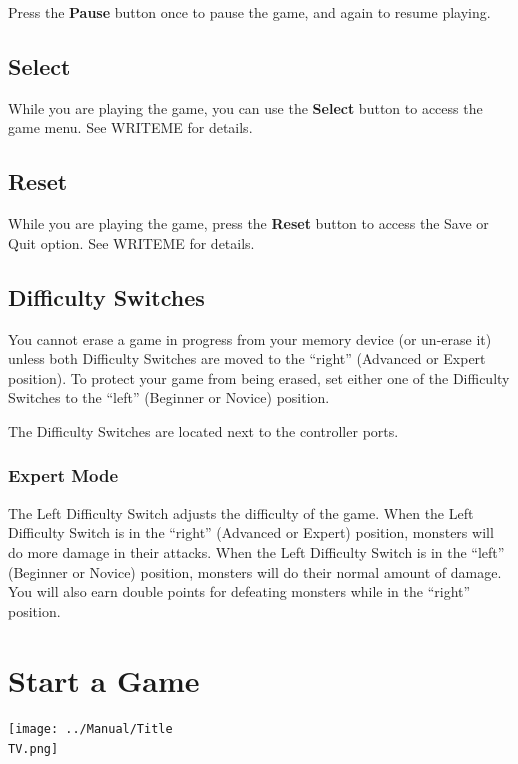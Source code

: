 \documentclass[10pt,twocolumn,openany,article]{memoir}
\newcommand\TV{NTSC}
\newcommand\TV{PAL}
\begin{document}
Press the  \textbf{Pause} button once  to pause  the game, and  again to
resume  playing.

\subsection{Select}

While you  are playing the  game, you  can use the  \textbf{Select}
button to access the game menu. See WRITEME for details.

\subsection{Reset}

While  you are  playing the  game,  press the  \textbf{Reset} button  to
access the Save or Quit option. See WRITEME for details.

\subsection{Difficulty Switches}

You cannot erase a game in progress from your memory device (or un-erase
it) unless both Difficulty Switches are moved to the ``right'' (Advanced
or Expert position). To protect your  game from being erased, set either
one  of   the  Difficulty   Switches  to   the  ``left''   (Beginner  or
Novice) position.

The Difficulty Switches are located next to the controller ports.

\subsubsection*{Expert Mode}

The Left Difficulty Switch adjusts the  difficulty of the game. When the
Left Difficulty  Switch is in  the ``right'' (Advanced or  Expert) position,
monsters will do more damage in  their attacks. When the Left Difficulty
Switch is in  the ``left'' (Beginner or Novice) position,  monsters will do
their normal  amount of  damage. You  will also  earn double  points for
defeating monsters while in the ``right'' position.

\section{Start a Game}

\begin{center}
  \texttt{[image: ../Manual/Title\\TV.png]}
\end{center}
\end{document}
